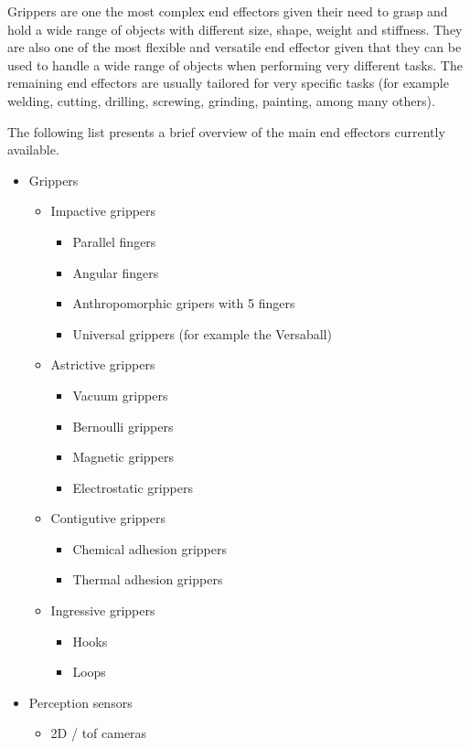 Grippers are one the most complex end effectors given their need to grasp and hold a wide range of objects with different size, shape, weight and stiffness. They are also one of the most flexible and versatile end effector given that they can be used to handle a wide range of objects when performing very different tasks. The remaining end effectors are usually tailored for very specific tasks (for example welding, cutting, drilling, screwing, grinding, painting, among many others).

The following list presents a brief overview of the main end effectors currently available.

\begin{itemize}
	\item Grippers
	\begin{itemize}
		\item Impactive grippers
		\begin{itemize}
			\item Parallel fingers
			\item Angular fingers
			\item Anthropomorphic gripers with 5 fingers
			\item Universal grippers (for example the Versaball)
		\end{itemize}
		\item Astrictive grippers
		\begin{itemize}
			\item Vacuum grippers
			\item Bernoulli grippers
			\item Magnetic grippers
			\item Electrostatic grippers
		\end{itemize}
		\item Contigutive grippers
		\begin{itemize}
			\item Chemical adhesion grippers
			\item Thermal adhesion grippers
		\end{itemize}
		\item Ingressive grippers
		\begin{itemize}
			\item Hooks
			\item Loops
		\end{itemize}
	\end{itemize}
	\item Perception sensors
	\begin{itemize}
		\item 2D / \gls{tof} cameras

\end{itemize}
\end{itemize}
